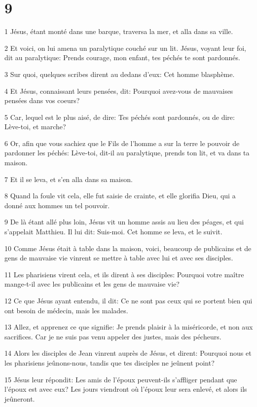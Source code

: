 \chapter{9}

\par 1 Jésus, étant monté dans une barque, traversa la mer, et alla dans sa ville.
\par 2 Et voici, on lui amena un paralytique couché sur un lit. Jésus, voyant leur foi, dit au paralytique: Prends courage, mon enfant, tes péchés te sont pardonnés.
\par 3 Sur quoi, quelques scribes dirent au dedans d'eux: Cet homme blasphème.
\par 4 Et Jésus, connaissant leurs pensées, dit: Pourquoi avez-vous de mauvaises pensées dans vos coeurs?
\par 5 Car, lequel est le plus aisé, de dire: Tes péchés sont pardonnés, ou de dire: Lève-toi, et marche?
\par 6 Or, afin que vous sachiez que le Fils de l'homme a sur la terre le pouvoir de pardonner les péchés: Lève-toi, dit-il au paralytique, prends ton lit, et va dans ta maison.
\par 7 Et il se leva, et s'en alla dans sa maison.
\par 8 Quand la foule vit cela, elle fut saisie de crainte, et elle glorifia Dieu, qui a donné aux hommes un tel pouvoir.
\par 9 De là étant allé plus loin, Jésus vit un homme assis au lieu des péages, et qui s'appelait Matthieu. Il lui dit: Suis-moi. Cet homme se leva, et le suivit.
\par 10 Comme Jésus était à table dans la maison, voici, beaucoup de publicains et de gens de mauvaise vie vinrent se mettre à table avec lui et avec ses disciples.
\par 11 Les pharisiens virent cela, et ils dirent à ses disciples: Pourquoi votre maître mange-t-il avec les publicains et les gens de mauvaise vie?
\par 12 Ce que Jésus ayant entendu, il dit: Ce ne sont pas ceux qui se portent bien qui ont besoin de médecin, mais les malades.
\par 13 Allez, et apprenez ce que signifie: Je prends plaisir à la miséricorde, et non aux sacrifices. Car je ne suis pas venu appeler des justes, mais des pécheurs.
\par 14 Alors les disciples de Jean vinrent auprès de Jésus, et dirent: Pourquoi nous et les pharisiens jeûnons-nous, tandis que tes disciples ne jeûnent point?
\par 15 Jésus leur répondit: Les amis de l'époux peuvent-ils s'affliger pendant que l'époux est avec eux? Les jours viendront où l'époux leur sera enlevé, et alors ils jeûneront.
